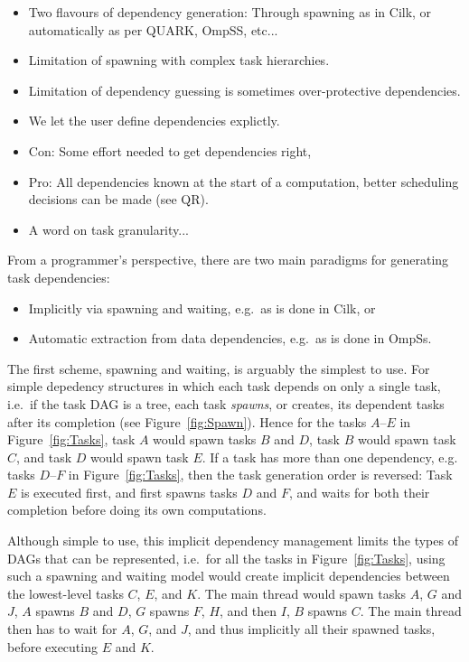\documentclass[preprint]{elsarticle}
\newcommand{\fig}[1]
    {Figure~\ref{fig:#1}}
\begin{document}
\begin{itemize}
  \item Two flavours of dependency generation: Through spawning as in Cilk,
    or automatically as per QUARK, OmpSS, etc...
  \item Limitation of spawning with complex task hierarchies.
  \item Limitation of dependency guessing is sometimes over-protective dependencies.
  \item We let the user define dependencies explictly.
  \item Con: Some effort needed to get dependencies right,
  \item Pro: All dependencies known at the start of a computation, better
    scheduling decisions can be made (see QR).
  \item A word on task granularity...
\end{itemize}

From a programmer's perspective, there are two main paradigms for generating
task dependencies:
\begin{itemize}
  \item Implicitly via spawning and waiting, e.g.~as is done in Cilk, or
  \item Automatic extraction from data dependencies, e.g.~as is done in OmpSs.
\end{itemize}

The first scheme, spawning and waiting, is arguably the simplest to
use.
For simple depedency structures in which each task depends on only a
single task, i.e.~if the task DAG is a tree, each task {\em spawns}, or
creates, its dependent tasks after its completion (see \fig{Spawn}).
Hence for the tasks $A$--$E$ in \fig{Tasks}, task $A$ would spawn
tasks $B$ and $D$, task $B$ would spawn task $C$, and task $D$ would
spawn task $E$.
If a task has more than one dependency, e.g. tasks $D$--$F$ in \fig{Tasks},
then the task generation order is reversed: Task $E$ is executed first,
and first spawns tasks $D$ and $F$, and waits for both their completion
before doing its own computations.

Although simple to use, this implicit dependency management
limits the types of DAGs that can be represented, i.e.~for
all the tasks in \fig{Tasks}, using such a spawning and waiting model
would create implicit dependencies between the lowest-level
tasks $C$, $E$, and $K$.
The main thread would spawn tasks $A$, $G$ and $J$, $A$ spawns $B$ and $D$,
$G$ spawns $F$, $H$, and then $I$, $B$ spawns $C$.
The main thread then has to wait for $A$, $G$, and $J$,
and thus implicitly all their spawned tasks, before executing
$E$ and $K$.
\end{document}
